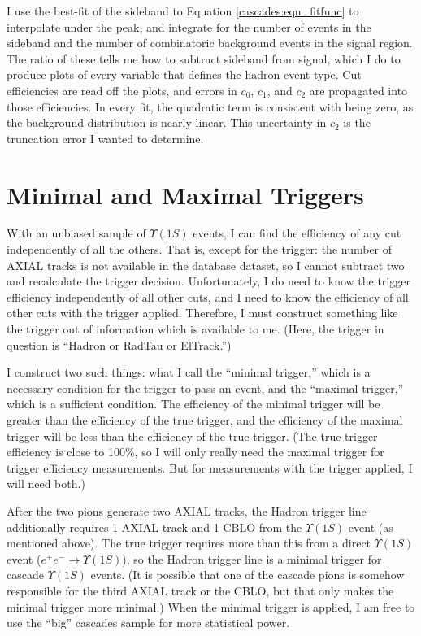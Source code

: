 I use the best-fit of the sideband to Equation
\ref{cascades:eqn_fitfunc} to interpolate under the peak, and
integrate for the number of events in the sideband and the number of
combinatoric background events in the signal region.  The ratio of
these tells me how to subtract sideband from signal, which I do to
produce plots of every variable that defines the hadron event type.
Cut efficiencies are read off the plots, and errors in $c_0$, $c_1$,
and $c_2$ are propagated into those efficiencies.  In every fit, the
quadratic term is consistent with being zero, as the background
distribution is nearly linear.  This uncertainty in $c_2$ is the
truncation error I wanted to determine.

\section{Minimal and Maximal Triggers}

With an unbiased sample of $\Upsilon(1S)$ events, I can find the
efficiency of any cut independently of all the others.  That is,
except for the trigger: the number of AXIAL tracks is not available in
the database dataset, so I cannot subtract two and recalculate the
trigger decision.  Unfortunately, I do need to know the trigger
efficiency independently of all other cuts, and I need to know the
efficiency of all other cuts with the trigger applied.  Therefore, I
must construct something like the trigger out of information which is
available to me.  (Here, the trigger in question is ``Hadron or RadTau
or ElTrack.'')

I construct two such things: what I call the ``minimal trigger,'' which
is a necessary condition for the trigger to pass an event, and the
``maximal trigger,'' which is a sufficient condition.  The efficiency
of the minimal trigger will be greater than the efficiency of the true
trigger, and the efficiency of the maximal trigger will be less than
the efficiency of the true trigger.  (The true trigger efficiency is
close to 100\%, so I will only really need the maximal trigger for
trigger efficiency measurements.  But for measurements with the
trigger applied, I will need both.)

After the two pions generate two AXIAL tracks, the Hadron trigger line
additionally requires 1 AXIAL track and 1 CBLO from the $\Upsilon(1S)$
event (as mentioned above).  The true trigger requires more than this
from a direct $\Upsilon(1S)$ event ($e^+e^- \to \Upsilon(1S)$), so the
Hadron trigger line is a minimal trigger for cascade $\Upsilon(1S)$
events.  (It is possible that one of the cascade pions is somehow
responsible for the third AXIAL track or the CBLO, but that only makes
the minimal trigger more minimal.)  When the minimal trigger is
applied, I am free to use the ``big'' cascades sample for more
statistical power.

